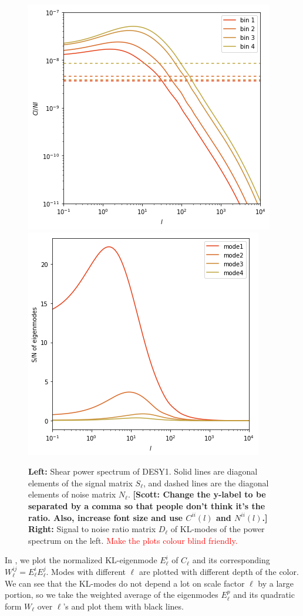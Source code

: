 \documentclass[twocolumn]{\docclass}
\newcommand\scott[1]{{\bf [Scott: #1]}}
\begin{document}
	\begin{figure}
		\includegraphics[width=0.7\columnwidth]{Cl_pst.png}
		\qquad \qquad \qquad
		\includegraphics[width=0.7\columnwidth]{Dl_pst.png}
		\caption{\textbf{Left:} Shear power spectrum of DESY1. Solid lines are diagonal elements of the signal matrix $S_{\ell}$, and dashed lines are the diagonal elements of noise matrix $N_{\ell}$. \scott{Change the y-label to be separated by a comma so that people don't think it's the ratio. Also, increase font size and use $C^{ii}(l)$ and $N^{ii}(l)$.} \textbf{Right:} Signal to noise ratio matrix $D_\ell$ of KL-modes of the power spectrum on the left. \textcolor{red}{Make the plots colour blind friendly.} \label{fig:ClDl}}
	\end{figure}
	
	In , we plot the normalized KL-eigenmode $E_\ell^i$ of $C_{\ell}$ and its corresponding $W^{ij}_\ell=E_\ell^i E_\ell^j$. Modes with different $\ell$ are plotted with different depth of the color. We can see that the KL-modes do not depend a lot on scale factor $\ell$ by a large portion, so we take the weighted average of the eigenmodes $E_\ell^p$ and its quadratic form $W_\ell$ over $\ell$'s and plot them with black lines. 
	
\end{document}
